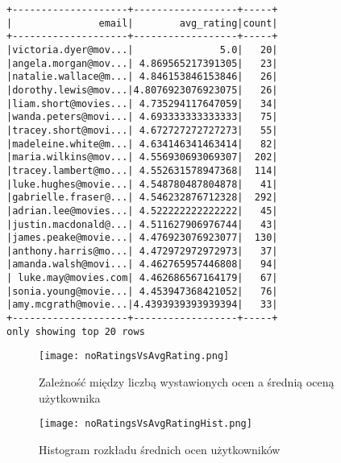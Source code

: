 \documentclass{article}
\begin{document}
\begin{verbatim}
+--------------------+------------------+-----+
|               email|        avg_rating|count|
+--------------------+------------------+-----+
|victoria.dyer@mov...|               5.0|   20|
|angela.morgan@mov...| 4.869565217391305|   23|
|natalie.wallace@m...| 4.846153846153846|   26|
|dorothy.lewis@mov...|4.8076923076923075|   26|
|liam.short@movies...| 4.735294117647059|   34|
|wanda.peters@movi...| 4.693333333333333|   75|
|tracey.short@movi...| 4.672727272727273|   55|
|madeleine.white@m...| 4.634146341463414|   82|
|maria.wilkins@mov...| 4.556930693069307|  202|
|tracey.lambert@mo...| 4.552631578947368|  114|
|luke.hughes@movie...| 4.548780487804878|   41|
|gabrielle.fraser@...| 4.546232876712328|  292|
|adrian.lee@movies...| 4.522222222222222|   45|
|justin.macdonald@...| 4.511627906976744|   43|
|james.peake@movie...| 4.476923076923077|  130|
|anthony.harris@mo...| 4.472972972972973|   37|
|amanda.walsh@movi...| 4.462765957446808|   94|
| luke.may@movies.com| 4.462686567164179|   67|
|sonia.young@movie...| 4.453947368421052|   76|
|amy.mcgrath@movie...|4.4393939393939394|   33|
+--------------------+------------------+-----+
only showing top 20 rows
\end{verbatim}

\begin{figure}[H]
    \centering
    \texttt{[image: noRatingsVsAvgRating.png]}
    \caption{Zależność między liczbą wystawionych ocen a średnią oceną użytkownika}
    \label{fig:ratings_vs_avg}
\end{figure}

\begin{figure}[H]
    \centering
    \texttt{[image: noRatingsVsAvgRatingHist.png]}
    \caption{Histogram rozkładu średnich ocen użytkowników}
    \label{fig:ratings_histogram}
\end{figure}
\end{document}
